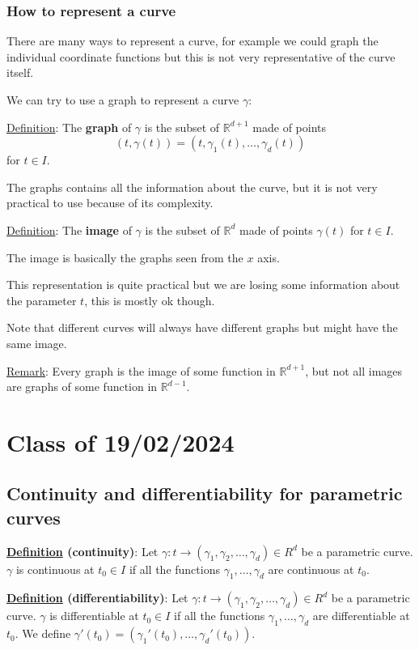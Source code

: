 \documentclass[10pt]{extarticle}
\newcommand{\R}{\mathbb{R}}
\begin{document}
\subsubsection{How to represent a curve}

There are many ways to represent a curve, for example we could graph the individual coordinate functions but this is not very representative of the curve itself.

We can try to use a graph to represent a curve $\gamma$:

\underline{Definition}: The \textbf{graph} of $\gamma$ is the subset of $\R^{d+1}$ made of points
$$
    (t, \gamma(t)) = (t, \gamma_1(t), \ldots, \gamma_d(t))
$$
for $t \in I$.

The graphs contains all the information about the curve, but it is not very practical to use because of its complexity.

\underline{Definition}: The \textbf{image} of $\gamma$ is the subset of $\R^d$ made of points $\gamma(t)$ for $t \in I$.

The image is basically the graphs seen from the $x$ axis.

This representation is quite practical but we are losing some information about the parameter $t$, this is mostly ok though.

Note that different curves will always have different graphs but might have the same image.

\underline{Remark}: Every graph is the image of some function in $\R^{d+1}$, but not all images are graphs of some function in $\R^{d-1}$.

\section{Class of 19/02/2024}

\subsection{Continuity and differentiability for parametric curves}

\textbf{\underline{Definition} (continuity)}: Let $\gamma: t \to (\gamma_1, \gamma_2, \ldots, \gamma_d) \in R^d$ be a parametric curve.
$\gamma$ is continuous at $t_0 \in I$ if all the functions $\gamma_1, \ldots, \gamma_d$ are continuous at $t_0$.

\textbf{\underline{Definition} (differentiability)}: Let $\gamma: t \to (\gamma_1, \gamma_2, \ldots, \gamma_d) \in R^d$ be a parametric curve.
$\gamma$ is differentiable at $t_0 \in I$ if all the functions $\gamma_1, \ldots, \gamma_d$ are differentiable at $t_0$.
We define $\gamma'(t_0) = (\gamma_1'(t_0), \ldots, \gamma_d'(t_0))$.
\end{document}
